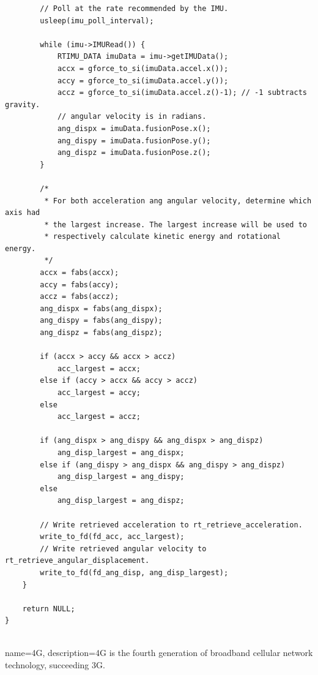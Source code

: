 \documentclass[12pt]{scrreprt}
\begin{document}
\begin{appendices}
\begin{verbatim}
        // Poll at the rate recommended by the IMU.
        usleep(imu_poll_interval);

        while (imu->IMURead()) {
            RTIMU_DATA imuData = imu->getIMUData();
            accx = gforce_to_si(imuData.accel.x());
            accy = gforce_to_si(imuData.accel.y());
            accz = gforce_to_si(imuData.accel.z()-1); // -1 subtracts gravity.
            // angular velocity is in radians.
            ang_dispx = imuData.fusionPose.x();
            ang_dispy = imuData.fusionPose.y();
            ang_dispz = imuData.fusionPose.z();
        }

        /*
         * For both acceleration ang angular velocity, determine which axis had
         * the largest increase. The largest increase will be used to
         * respectively calculate kinetic energy and rotational energy.
         */
        accx = fabs(accx);
        accy = fabs(accy);
        accz = fabs(accz);
        ang_dispx = fabs(ang_dispx);
        ang_dispy = fabs(ang_dispy);
        ang_dispz = fabs(ang_dispz);

        if (accx > accy && accx > accz)
            acc_largest = accx;
        else if (accy > accx && accy > accz)
            acc_largest = accy;
        else
            acc_largest = accz;

        if (ang_dispx > ang_dispy && ang_dispx > ang_dispz)
            ang_disp_largest = ang_dispx;
        else if (ang_dispy > ang_dispx && ang_dispy > ang_dispz)
            ang_disp_largest = ang_dispy;
        else
            ang_disp_largest = ang_dispz;

        // Write retrieved acceleration to rt_retrieve_acceleration.
        write_to_fd(fd_acc, acc_largest);
        // Write retrieved angular velocity to rt_retrieve_angular_displacement.
        write_to_fd(fd_ang_disp, ang_disp_largest);
    }

    return NULL;
}


\end{verbatim}


\end{appendices}


{
        name=4G,
        description={4G is the fourth generation of broadband cellular network technology, succeeding 3G. }
}
\end{document}
